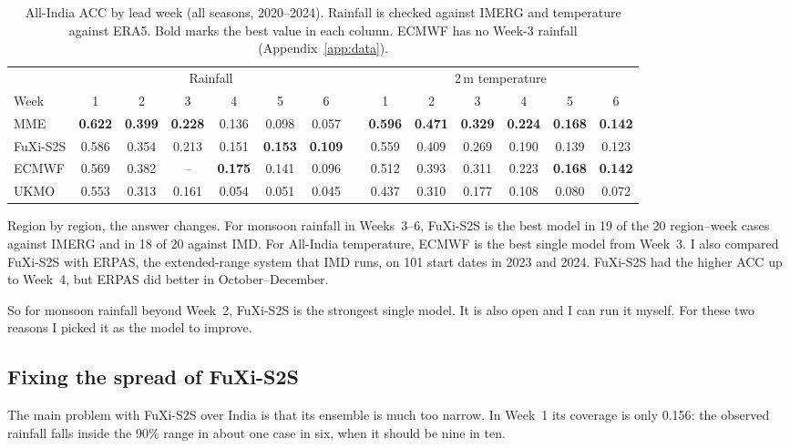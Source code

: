 \documentclass[11pt,a4paper]{article}
\begin{document}
\begin{table}[htb]
\centering\small
\caption{All-India ACC by lead week (all seasons, 2020--2024). Rainfall is checked against IMERG and temperature against ERA5. Bold
marks the best value in each column. ECMWF has no Week-3 rainfall (Appendix~\ref{app:data}).}
\label{tab:acc}
\setlength{\tabcolsep}{5.2pt}
\begin{tabular}{@{}l cccccc c cccccc@{}}
\toprule
 & \multicolumn{6}{c}{Rainfall} & & \multicolumn{6}{c}{2\,m temperature} \\
\cmidrule(lr){2-7}\cmidrule(lr){9-14}
Week & 1 & 2 & 3 & 4 & 5 & 6 & & 1 & 2 & 3 & 4 & 5 & 6 \\
\midrule
MME      & \textbf{0.622} & \textbf{0.399} & \textbf{0.228} & 0.136 & 0.098 & 0.057 & & \textbf{0.596} & \textbf{0.471} & \textbf{0.329} & \textbf{0.224} & \textbf{0.168} & \textbf{0.142} \\
FuXi-S2S & 0.586 & 0.354 & 0.213 & 0.151 & \textbf{0.153} & \textbf{0.109} & & 0.559 & 0.409 & 0.269 & 0.190 & 0.139 & 0.123 \\
ECMWF    & 0.569 & 0.382 & --    & \textbf{0.175} & 0.141 & 0.096 & & 0.512 & 0.393 & 0.311 & 0.223 & \textbf{0.168} & \textbf{0.142} \\
UKMO     & 0.553 & 0.313 & 0.161 & 0.054 & 0.051 & 0.045 & & 0.437 & 0.310 & 0.177 & 0.108 & 0.080 & 0.072 \\
\bottomrule
\end{tabular}
\end{table}

Region by region, the answer changes. For monsoon rainfall in Weeks~3--6, FuXi-S2S is the best model
in 19 of the 20 region--week cases against IMERG and in 18 of 20 against IMD. For All-India temperature, ECMWF is the best single
model from Week~3. I also compared FuXi-S2S with ERPAS, the extended-range system that IMD runs, on 101 start dates in 2023 and
2024. FuXi-S2S had the higher ACC up to Week~4, but ERPAS did better in October--December.

So for monsoon rainfall beyond Week~2, FuXi-S2S is the strongest single model. It is also open and I can run it myself. For these
two reasons I picked it as the model to improve.

\subsection{Fixing the spread of FuXi-S2S}
The main problem with FuXi-S2S over India is that its ensemble is much too narrow. In Week~1 its coverage is only 0.156: the
observed rainfall falls inside the 90\% range in about one case in six, when it should be nine in ten.
\end{document}
